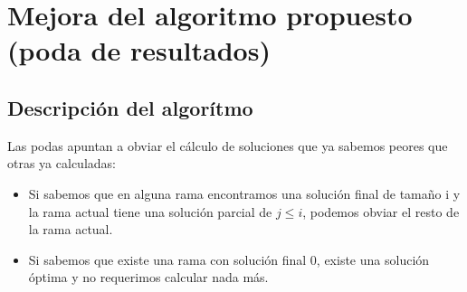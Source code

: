 \section{Mejora del algoritmo propuesto (poda de resultados)}
	\subsection{Descripción del algorítmo}

	Las podas apuntan a obviar el cálculo de soluciones que ya sabemos peores que otras ya calculadas:

	\begin{itemize}

		\item Si sabemos que en alguna rama encontramos una solución final de tamaño i y la rama actual tiene una solución parcial de $j \leq i$, podemos obviar el resto de la rama actual.

		\item Si sabemos que existe una rama con solución final 0, existe una solución óptima y no requerimos calcular nada más.

	\end{itemize}

